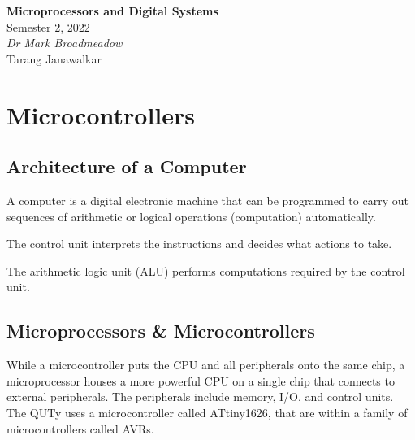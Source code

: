 \documentclass[a4paper]{report}
\date{}
\newcommand{\unitName}{Microprocessors and Digital Systems}
\newcommand{\unitTime}{Semester 2, 2022}
\newcommand{\unitCoordinator}{Dr Mark Broadmeadow}
\newcommand{\documentAuthors}{Tarang Janawalkar}
\begin{document}
%
\begin{titlepage}
    \vspace*{\fill}
    \begin{center}
        \LARGE{\textbf{\unitName}} \\[0.1in]
        \normalsize{\unitTime} \\[0.2in]
        \normalsize\textit{\unitCoordinator} \\[0.2in]
        \documentAuthors
    \end{center}
    \vspace*{\fill}
    \doclicenseThis
    \thispagestyle{empty}
\end{titlepage}
\newpage
%
\tableofcontents
\newpage
%
\chapter{Microcontrollers}
\section{Architecture of a Computer}
\begin{definition}[Computer]
    A computer is a digital electronic machine that can be programmed to carry
    out sequences of arithmetic or logical operations (computation) automatically.
\end{definition}
\begin{definition}
    The control unit interprets the instructions and decides what actions to take.
\end{definition}
\begin{definition}
    The arithmetic logic unit (ALU) performs computations required by the control unit.
\end{definition}
\section{Microprocessors \& Microcontrollers}
While a microcontroller puts the CPU and all peripherals onto the same
chip, a microprocessor houses a more powerful CPU on a single chip that
connects to external peripherals. The peripherals include memory, I/O,
and control units. The QUTy uses a microcontroller called ATtiny1626,
that are within a family of microcontrollers called AVRs.
\end{document}
